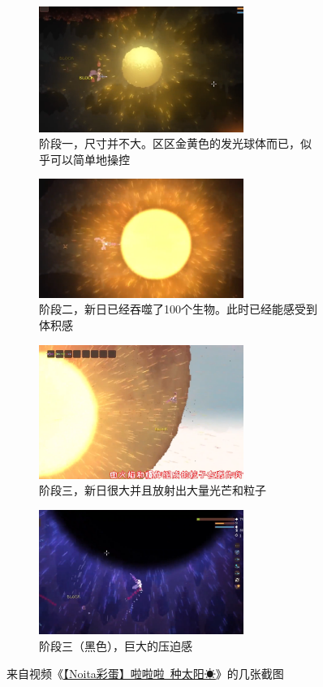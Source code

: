 \documentclass[11pt]{article}
\begin{document}
    \begin{figure}[ht]
        \begin{subfigure}{18em}
            \centering
            \includegraphics[width=18em]{./imgs/Sun_small}
            \caption{阶段一，尺寸并不大。区区金黄色的发光球体而已，似乎可以简单地操控}
        \end{subfigure}
        \begin{subfigure}{18em}
            \centering
            \includegraphics[width=18em]{./imgs/Sun_medium}
            \caption{阶段二，新日已经吞噬了100个生物。此时已经能感受到体积感}
        \end{subfigure}
        \begin{subfigure}{18em}
            \centering
            \includegraphics[width=18em]{./imgs/Sun_full}
            \caption{阶段三，新日很大并且放射出大量光芒和粒子}
        \end{subfigure}
        \begin{subfigure}{18em}
            \centering
            \includegraphics[width=18em]{./imgs/Sun_dark}
            \caption{阶段三（黑色），巨大的压迫感}
        \end{subfigure}
        \caption{来自视频《\href{https://www.bilibili.com/video/BV1CZ4y1w7AL}{【Noita彩蛋】啦啦啦~种太阳☀}》的几张截图}
        \label{fig:sun-screenshots}
    \end{figure}
\end{document}
